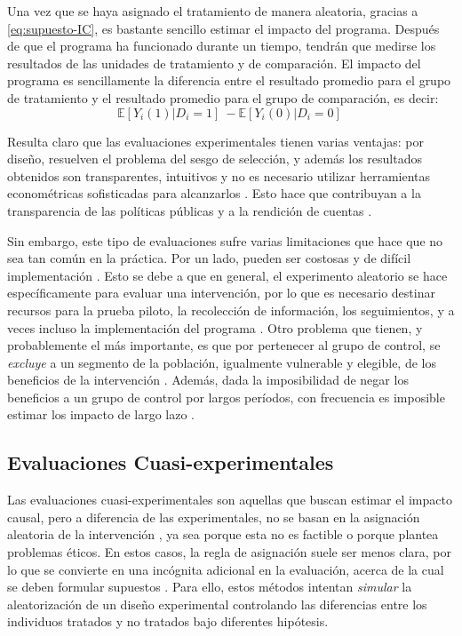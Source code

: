 \documentclass[../../main.tex]{subfiles}
\begin{document}
Una vez que se haya asignado el tratamiento de manera aleatoria, gracias a \ref{eq:supuesto-IC}, es bastante sencillo estimar el impacto del programa. Después de que el programa ha funcionado durante un tiempo, tendrán que medirse los resultados de las unidades de tratamiento y de comparación. El impacto del programa es sencillamente la diferencia entre el resultado promedio para el grupo de tratamiento y el resultado promedio para el grupo de comparación, es decir:
\[
\mathbb{E} \left[Y_i(1)|D_i=1\right]\ - \mathbb{E} \left[Y_i(0)|D_i=0\right]\
\]

Resulta claro que las evaluaciones experimentales tienen varias ventajas: por diseño, resuelven el problema del sesgo de selección, y además los resultados obtenidos son transparentes, intuitivos y no es necesario utilizar herramientas econométricas sofisticadas para alcanzarlos \cite{bernal}. Esto hace que contribuyan a la transparencia de las políticas públicas y a la rendición de cuentas \cite{bernal}.

Sin embargo, este tipo de evaluaciones sufre varias limitaciones que hace que no sea tan común en la práctica. Por un lado, pueden ser costosas y de difícil implementación \cite{bernal}. Esto se debe a que en general, el experimento aleatorio se hace específicamente para evaluar una intervención, por lo que es necesario destinar recursos para la prueba piloto, la recolección de información, los seguimientos, y a veces incluso la implementación del programa \cite{bernal}. Otro problema que tienen, y probablemente el más importante, es que por pertenecer al grupo de control, se \textit{excluye} a un segmento de la población, igualmente vulnerable y elegible, de los beneficios de la intervención \cite{bernal}. Además, dada la imposibilidad de negar los beneficios a un grupo de control por largos períodos, con frecuencia es imposible estimar los impacto de largo lazo \cite{bernal}.   

\subsection{Evaluaciones Cuasi-experimentales}
Las evaluaciones cuasi-experimentales son aquellas que buscan estimar el impacto causal, pero a diferencia de las experimentales, no se basan en la asignación aleatoria de la intervención \cite{gertler-2016}, ya sea porque esta no es factible o porque plantea problemas éticos. En estos casos, la regla de asignación suele ser menos clara, por lo que se convierte en una incógnita adicional en la evaluación, acerca de la cual se deben formular supuestos \cite{gertler-2016}. Para ello, estos métodos intentan \textit{simular} la aleatorización de un diseño experimental controlando las diferencias entre los individuos tratados y no tratados bajo diferentes hipótesis.
\end{document}
